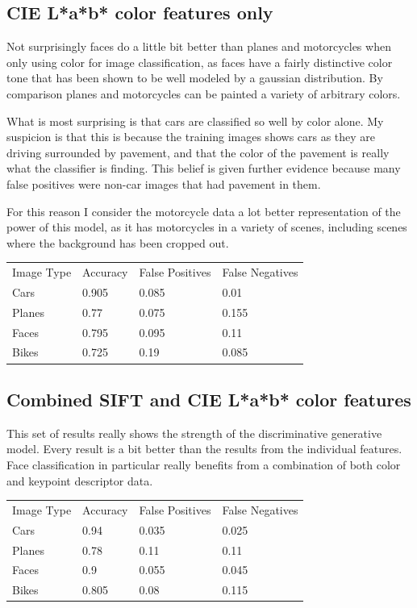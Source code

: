 \documentclass[11pt]{article}
\begin{document}
\subsection{CIE L*a*b* color features only}

Not surprisingly faces do a little bit better than planes and
motorcycles when only using color for image classification, as faces
have a fairly distinctive color tone that has been shown to be well
modeled by a gaussian distribution. By comparison planes and
motorcycles can be painted a variety of arbitrary colors.

What is most surprising is that cars are classified so well by color
alone. My suspicion is that this is because the training images shows
cars as they are driving surrounded by pavement, and that the color
of the pavement is really what the classifier is finding. This belief
is given further evidence because many false positives were non-car
images that had pavement in them.

For this reason I consider the motorcycle data a lot better
representation of the power of this model, as it has motorcycles in a
variety of scenes, including scenes where the background has been
cropped out.

\begin{tabular}{| l | l | l | l |}
  \hline
  Image Type & Accuracy     & False Positives    & False Negatives \\
  Cars      & 0.905 & 0.085 & 0.01  \\
  Planes    & 0.77  & 0.075 & 0.155 \\
  Faces     & 0.795 & 0.095 & 0.11  \\
  Bikes     & 0.725 & 0.19  & 0.085 \\
  \hline
\end{tabular}

\subsection{Combined SIFT and CIE L*a*b* color features}

This set of results really shows the strength of the discriminative
generative model. Every result is a bit better than the results from
the individual features. Face classification in particular really
benefits from a combination of both color and keypoint descriptor
data.

\begin{tabular}{| l | l | l | l |}
  \hline
  Image Type & Accuracy     & False Positives    & False Negatives \\
  Cars      & 0.94  & 0.035 & 0.025 \\
  Planes    & 0.78  & 0.11  & 0.11  \\
  Faces     & 0.9   & 0.055 & 0.045 \\
  Bikes     & 0.805 & 0.08  & 0.115 \\
  \hline
\end{tabular}
\end{document}
